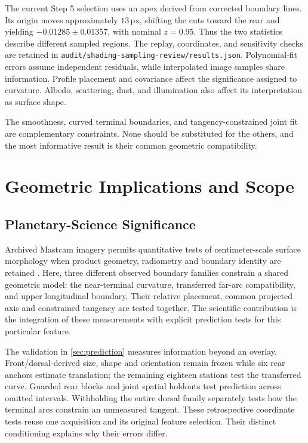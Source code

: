 \documentclass[11pt,letterpaper]{article}
\newcommand{\px}{\,\mathrm{px}}
\newcommand{\sourcepath}[1]{\nolinkurl{#1}}
\begin{document}
The current Step 5 selection uses an apex derived from corrected boundary lines. Its origin moves approximately $13\px$, shifting the cuts toward the rear and yielding $-0.01285\pm0.01357$, with nominal $z=0.95$. Thus the two statistics describe different sampled regions. The replay, coordinates, and sensitivity checks are retained in \sourcepath{audit/shading-sampling-review/results.json}. Polynomial-fit errors assume independent residuals, while interpolated image samples share information. Profile placement and covariance affect the significance assigned to curvature. Albedo, scattering, dust, and illumination also affect its interpretation as surface shape.

The smoothness, curved terminal boundaries, and tangency-constrained joint fit are complementary constraints. None should be substituted for the others, and the most informative result is their common geometric compatibility.

\section{Geometric Implications and Scope}
\label{sec:discussion}

\subsection{Planetary-Science Significance}

Archived Mastcam imagery permits quantitative tests of centimeter-scale surface morphology when product geometry, radiometry and boundary identity are retained \cite{malin2017,bell2017}. Here, three different observed boundary families constrain a shared geometric model: the near-terminal curvature, transferred far-arc compatibility, and upper longitudinal boundary. Their relative placement, common projected axis and constrained tangency are tested together. The scientific contribution is the integration of these measurements with explicit prediction tests for this particular feature.

The validation in \cref{sec:prediction} measures information beyond an overlay. Front/dorsal-derived size, shape and orientation remain frozen while six rear anchors estimate translation; the remaining eighteen stations test the transferred curve. Guarded rear blocks and joint spatial holdouts test prediction across omitted intervals. Withholding the entire dorsal family separately tests how the terminal arcs constrain an unmeasured tangent. These retrospective coordinate tests reuse one acquisition and its original feature selection. Their distinct conditioning explains why their errors differ.
\end{document}
